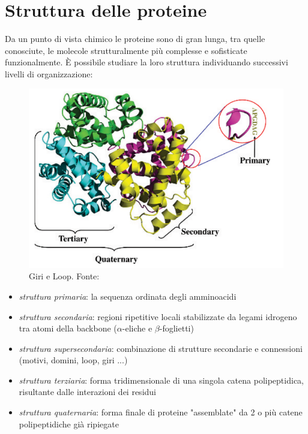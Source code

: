 \section{Struttura delle proteine}
Da un punto di vista chimico le proteine sono di gran lunga, tra quelle conosciute, le molecole strutturalmente più complesse e sofisticate funzionalmente. È possibile studiare la loro struttura individuando successivi livelli di organizzazione:

\begin{figure}[!htp]
	\centering
	\includegraphics[scale=0.4]{images/strutture-proteina.png}
	\caption{Giri e Loop. Fonte: \cite{kessel_ben-tal_2018}}
	\label{fig:strutture-proteine}
\end{figure}

\begin{itemize}
	\item \textit{struttura primaria}: la sequenza ordinata degli amminoacidi
	\item \textit{struttura secondaria}: regioni ripetitive locali stabilizzate da legami idrogeno tra atomi della backbone ($\alpha$-eliche e $\beta$-foglietti)
	\item \textit{struttura supersecondaria}: combinazione di strutture secondarie e connessioni (motivi, domini, loop, giri ...)
	\item \textit{struttura terziaria}: forma tridimensionale di una singola catena polipeptidica, risultante dalle interazioni dei residui
	\item \textit{struttura quaternaria}: forma finale di proteine "assemblate" da 2 o più catene polipeptidiche già ripiegate
\end{itemize}

